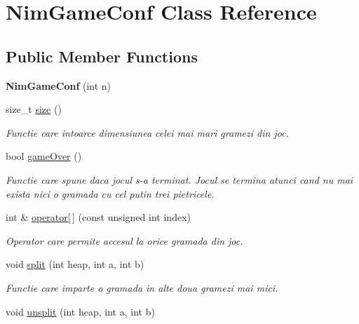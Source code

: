 \hypertarget{classNimGameConf}{
\section{NimGameConf Class Reference}
\label{classNimGameConf}
}
\subsection*{Public Member Functions}
\begin{DoxyCompactItemize}
\item 
\hypertarget{classNimGameConf_aca38313f09d82be07a32770a9f6875cc}{
{\bfseries NimGameConf} (int n)}
\label{classNimGameConf_aca38313f09d82be07a32770a9f6875cc}

\item 
size\_\-t \hyperlink{classNimGameConf_a6562b1e5b81ef42b350abdb7b3f024be}{size} ()
\begin{DoxyCompactList}\small\item\em Functie care intoarce dimensiunea celei mai mari gramezi din joc. \item\end{DoxyCompactList}\item 
bool \hyperlink{classNimGameConf_a9d882cf631a20956c0e542dd71a8b726}{gameOver} ()
\begin{DoxyCompactList}\small\item\em Functie care spune daca jocul s-\/a terminat. Jocul se termina atunci cand nu mai exista nici o gramada cu cel putin trei pietricele. \item\end{DoxyCompactList}\item 
\hypertarget{classNimGameConf_ad8c71ec49bf1a773c169f6a57523309e}{
int \& \hyperlink{classNimGameConf_ad8c71ec49bf1a773c169f6a57523309e}{operator\mbox{[}$\,$\mbox{]}} (const unsigned int index)}
\label{classNimGameConf_ad8c71ec49bf1a773c169f6a57523309e}

\begin{DoxyCompactList}\small\item\em Operator care permite accesul la orice gramada din joc. \item\end{DoxyCompactList}\item 
void \hyperlink{classNimGameConf_ad19bf383bbd4eafc893491e31059d777}{split} (int heap, int a, int b)
\begin{DoxyCompactList}\small\item\em Functie care imparte o gramada in alte doua gramezi mai mici. \item\end{DoxyCompactList}\item 
\hypertarget{classNimGameConf_a8001a96febdfe2ce67ae8cee025a89e0}{
void \hyperlink{classNimGameConf_a8001a96febdfe2ce67ae8cee025a89e0}{unsplit} (int heap, int a, int b)}
\label{classNimGameConf_a8001a96febdfe2ce67ae8cee025a89e0}


\end{DoxyCompactItemize}
